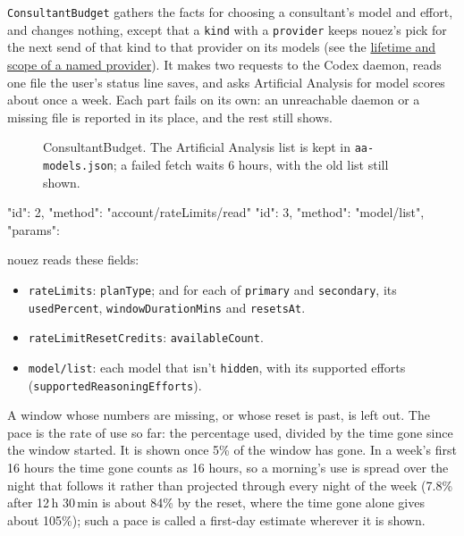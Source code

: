 \documentclass[10pt,a4paper]{article}
\newcommand{\lifelines}[2]{%
  \foreach \x/\name/\col in {#1} {%
    \node[actor, draw=\col, text=\col] at (\x,0) {\name};
    \draw[lifeline] (\x,-0.4) -- (\x,-#2);
  }}
\newcommand{\msg}[4]{\draw[call] (#2,-#1) -- node[above=1pt,lbl]{#4} (#3,-#1);}
\newcommand{\ret}[4]{\draw[reply] (#2,-#1) -- node[above=1pt,lbl]{#4} (#3,-#1);}
\newcommand{\code}[1]{\texttt{#1}}
\begin{document}
\code{ConsultantBudget} gathers the facts for choosing a consultant's model and effort, and changes
nothing, except that a \code{kind} with a \code{provider} keeps nouez's pick for the next send of
that kind to that provider on its models (see the
\href{https://github.com/jibarix/nouez/blob/v0.31.2/docs/rules.md#rule-named-provider}{lifetime and scope of a named provider}). It makes two requests to the Codex daemon, reads one file the user's status line saves, and
asks Artificial Analysis for model scores about once a week. Each part fails on its own: an
unreachable daemon or a missing file is reported in its place, and the rest still shows.

\begin{figure}[H]
\centering
{}
\caption{ConsultantBudget. The Artificial Analysis list is kept in \code{aa-models.json}; a failed
fetch waits 6 hours, with the old list still shown.}
\end{figure}

\begin{wire}
{"id": 2, "method": "account/rateLimits/read"}
{"id": 3, "method": "model/list", "params": {}}
\end{wire}

nouez reads these fields:

\begin{itemize}
\item \code{rateLimits}: \code{planType}; and for each of \code{primary} and \code{secondary}, its
  \code{usedPercent}, \code{windowDurationMins} and \code{resetsAt}.
\item \code{rateLimitResetCredits}: \code{availableCount}.
\item \code{model/list}: each model that isn't \code{hidden}, with its supported efforts
  (\code{supportedReasoningEfforts}).
\end{itemize}

A window whose numbers are missing, or whose reset is past, is left out. The pace is the rate of
use so far: the percentage used, divided by the time gone since the window started. It is shown
once 5\% of the window has gone. In a week's first 16 hours the time gone counts as 16 hours, so a
morning's use is spread over the night that follows it rather than projected through every night of
the week (7.8\% after 12\,h 30\,min is about 84\% by the reset, where the time gone alone gives
about 105\%); such a pace is called a first-day estimate wherever it is shown.
\end{document}
